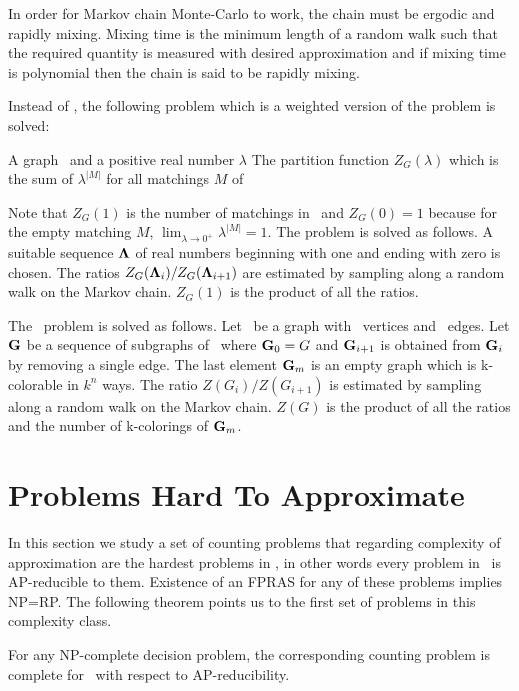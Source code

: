 In order for Markov chain Monte-Carlo to work, the chain must be ergodic and rapidly mixing.
Mixing time is the minimum length of a random walk such that the required
quantity is measured with desired approximation and if mixing
time is polynomial then the chain is said to be rapidly mixing.

Instead of , the following problem which is a weighted version of
the  problem is solved:

{A graph \mG\ and a positive real number \(\lambda\)}
{The partition function \(Z_G(\lambda)\) which is the sum of
\(\lambda^{|M|}\) for all matchings \(M\) of \mG}

Note that \(Z_G(1)\) is the number of matchings in \mG\ and \(Z_G(0)=1\) because
for the empty matching \(M\), \(\lim_{\lambda\to 0^+}\lambda^{|M|}=1\).
The  problem is solved as follows.
A suitable sequence \(\mathbf{\Lambda}\) of real numbers beginning with one and ending
with zero is chosen. The ratios \(Z_G(\mathbf{\Lambda}_i)/Z_G(\mathbf{\Lambda}_{i+1})\) are estimated 
by sampling along a random walk on the Markov chain. \(Z_G(1)\) is the product of
all the ratios.

The \ldkcol\ problem is solved as follows. Let \mG\ be a graph with \mn\ vertices
and \mm\ edges. Let \(\mathbf{G}\) be a sequence of subgraphs of \mG\ where
\(\mathbf{G}_0=G\) and \(\mathbf{G}_{i+1}\) is obtained from \(\mathbf{G}_i\) by removing a single edge. 
The last element \(\mathbf{G}_m\) is an empty graph which is k-colorable in \(k^n\) ways.
The ratio \(Z(G_i)/Z(G_{i+1})\) is estimated
by sampling along a random walk on the Markov chain. \(Z(G)\) is the product of all the
ratios and the number of k-colorings of \(\mathbf{G}_m\).


\section{Problems Hard To Approximate} \label{sec:hard}
In this section we study a set of counting problems that regarding complexity
of approximation are the hardest problems in \cp, in other words every
problem in \cp\ is AP-reducible to them.
Existence of an FPRAS for any of these problems implies NP=RP\@. The following theorem 
points us to the first set of problems in this complexity class.

\begin{theorem} 
For any NP-complete decision problem, the corresponding counting problem is complete
for \cp\ with respect to AP-reducibility.
\end{theorem}

